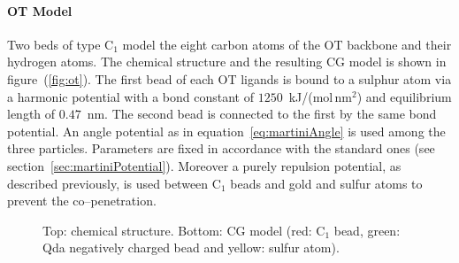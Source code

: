 \paragraph{\textbf{OT Model}} Two \martini beds of type C$_1$ model the eight carbon atoms of the \ac{OT} backbone and their hydrogen atoms. The chemical structure and the resulting \ac{CG} \martini model is shown in figure~(\ref{fig:ot}). The first bead of each \ac{OT} ligands is bound to a sulphur atom via a harmonic potential with a bond constant of $1250$~kJ/(mol\,nm$^2$) and equilibrium length of $0.47$~nm. The second bead is connected to the first by the same bond potential. An angle potential as in equation~\eqref{eq:martiniAngle} is used among the three particles. Parameters are fixed in accordance with the standard \martini ones (see section~\ref{sec:martiniPotential}). Moreover a purely repulsion potential, as described previously, is used between C$_1$ beads and gold and sulfur atoms to prevent the co--penetration.
\begin{figure}[!ht]
	\centering
	\qquad\qquad%
	\caption{Top: chemical structure. Bottom: \acs{CG} \martini model (red: C$_1$ bead, green: Qda negatively charged bead and yellow: sulfur atom).}
\end{figure}

